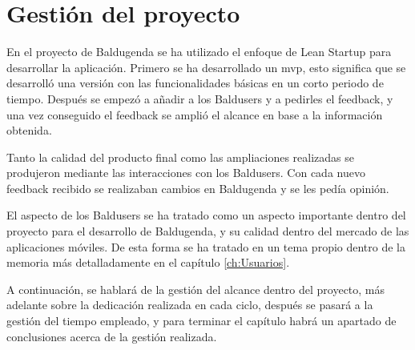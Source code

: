 \chapter{Gestión del proyecto}
\label{ch:Gestion del proyecto}
En el proyecto de Baldugenda se ha utilizado el enfoque de Lean Startup \cite{LeanStartup} para desarrollar la aplicación. Primero se ha desarrollado un \acrshort{mvp}, esto significa que se desarrolló una versión con las funcionalidades básicas en un corto periodo de tiempo. Después se empezó a añadir a los Baldusers y a pedirles el feedback, y una vez conseguido el feedback se amplió el alcance en base a la información obtenida.

Tanto la calidad del producto final como las ampliaciones realizadas se produjeron mediante las interacciones con los Baldusers. Con cada nuevo feedback recibido se realizaban cambios en Baldugenda y se les pedía opinión.

El aspecto de los Baldusers se ha tratado como un aspecto importante dentro del proyecto para el desarrollo de Baldugenda, y su calidad dentro del mercado de las aplicaciones móviles. De esta forma se ha tratado en un tema propio dentro de la memoria más detalladamente en el capítulo \ref{ch:Usuarios}.

A continuación, se hablará de la gestión del alcance dentro del proyecto, más adelante sobre la dedicación realizada en cada ciclo, después se pasará a la gestión del tiempo empleado, y para terminar el capítulo habrá un apartado de conclusiones acerca de la gestión realizada.
\newpage

\newpage

\newpage

\newpage
































